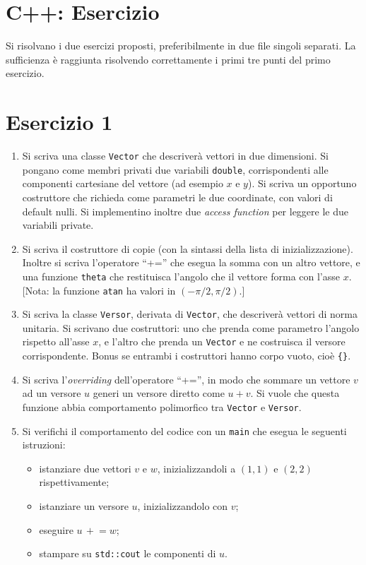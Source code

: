 \documentclass[12pt]{article}
\begin{document}
\clearpage
\section{C++: Esercizio}



Si risolvano i due esercizi proposti, preferibilmente in due file singoli separati.
La sufficienza \`e raggiunta risolvendo correttamente i primi tre punti del primo esercizio.



\section*{Esercizio 1}


\begin{enumerate}

\item
Si scriva una classe {\tt Vector} che descriver\`a vettori in due dimensioni.
Si pongano come membri privati due variabili {\tt double}, corrispondenti
alle componenti cartesiane del vettore (ad esempio $x$ e $y$).
Si scriva un opportuno costruttore che richieda
come parametri le due coordinate, con valori di default nulli.
Si implementino inoltre due \emph{access function} per leggere le due variabili private.

\item
Si scriva il costruttore di copie (con la sintassi della lista di inizializzazione).
Inoltre si scriva l'operatore ``+='' che esegua la somma con un altro vettore,
e una funzione {\tt theta} che restituisca l'angolo che il vettore forma con l'asse $x$.
[Nota: la funzione {\tt atan} ha valori in $(-\pi/2,\pi/2)$.]

\item
Si scriva la classe {\tt Versor}, derivata di {\tt Vector},
che descriver\`a vettori di norma unitaria.
Si scrivano due costruttori: uno che prenda come parametro l'angolo rispetto all'asse $x$,
e l'altro che prenda un {\tt Vector} e ne costruisca il versore corrispondente.
Bonus se entrambi i costruttori hanno corpo vuoto, cio\`e {\tt \{\}}.

\item
Si scriva l'{\it overriding} dell'operatore ``+='', in modo che sommare un vettore $v$ ad un versore $u$
generi un versore diretto come $u+v$.
Si vuole che questa funzione abbia comportamento polimorfico tra {\tt Vector} e {\tt Versor}.

\item
Si verifichi il comportamento del codice con un {\tt main}
che esegua le seguenti istruzioni:
\begin{itemize}
\item istanziare due vettori $v$ e $w$, inizializzandoli a $(1,1)$ e $(2,2)$ rispettivamente;
\item istanziare un versore $u$, inizializzandolo con $v$;
\item eseguire $u\,+\!=w$;
\item stampare su {\tt std::cout} le componenti di $u$.
\end{itemize}


\end{enumerate}
\end{document}
